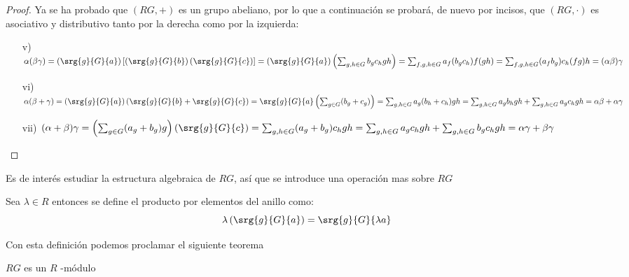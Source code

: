 \begin{proof}
Ya se ha probado que $(RG,+)$ es un grupo abeliano, por lo que a continuación se probará, de nuevo por incisos, que $(RG,\cdot)$ es asociativo y distributivo tanto por la derecha como por la izquierda:
\begin{itemize}
\item[v)] $\alpha(\beta\gamma) = \left(\srg{g}{G}{a}\right)\left[\left(\srg{g}{G}{b}\right)\left(\srg{g}{G}{c}\right)\right] = \left(\srg{g}{G}{a}\right)\left(\sum_{g,h\in G}b_gc_hgh\right) = \sum_{f,g,h \in G}a_f(b_gc_h)f(gh) = \sum_{f,g,h \in G} (a_fb_g)c_h(fg)h = (\alpha\beta)\gamma$
\item[vi)]  $\alpha(\beta + \gamma) = \left( \srg{g}{G}{a} \right) \left(\srg{g}{G}{b} + \srg{g}{G}{c} \right) = \srg{g}{G}{a} \left( \sum_{g \in G}(b_g+c_g)\right) = \sum_{g,h \in G}a_g(b_h+c_h)gh  = \sum_{g,h \in G} a_gb_hgh + \sum_{g,h \in G} a_gc_hgh = \alpha\beta + \alpha\gamma$  
\item[vii)] $(\alpha + \beta)\gamma = \left( \sum_{g\in G}(a_g+b_g)g\right) \left(\srg{g}{G}{c}\right) = \sum_{g,h \in G} (a_g+b_g)c_hgh = \sum_{g,h \in G}a_gc_hgh + \sum_{g,h\in G}b_gc_hgh = \alpha\gamma + \beta\gamma$ \qedhere


\end{itemize}
\end{proof}


Es de interés estudiar la estructura algebraica de $RG$, así que se introduce una operación mas sobre $RG$


\begin{definicion}
Sea $\lambda \in R$ entonces se define el producto por elementos del anillo como: 
\begin{equation}
\lambda \left(\srg{g}{G}{a}\right) = \srg{g}{G}{\lambda a}
\end{equation}
\end{definicion}

Con esta definición podemos proclamar el siguiente teorema

\begin{teorema}
$RG$ es un $R$ -módulo
\end{teorema}


